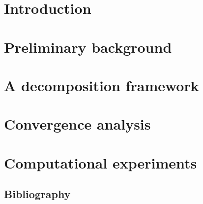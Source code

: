 \documentclass[preprint,12pt]{elsarticle}
\begin{document}

\section{Introduction}

\clearpage
\section{Preliminary background}\label{sect:2}

\clearpage
\section{A decomposition framework}

\clearpage
\section{Convergence analysis}


\clearpage
\section{Computational experiments}

\clearpage




\begin{thebibliography}{00}
\section{Bibliography}


\end{thebibliography}
\end{document}
